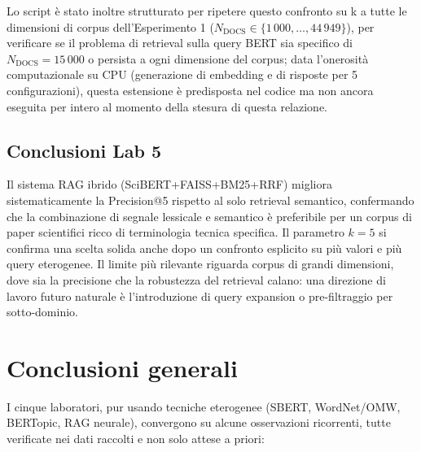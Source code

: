 \documentclass[12pt,a4paper]{article}
\begin{document}
Lo script \`e stato inoltre strutturato per ripetere questo confronto su k a tutte le dimensioni di corpus dell'Esperimento 1 ($N_{\text{DOCS}} \in \{1\,000, \dots, 44\,949\}$), per verificare se il problema di retrieval sulla query BERT sia specifico di $N_{\text{DOCS}}=15\,000$ o persista a ogni dimensione del corpus; data l'onerosit\`a computazionale su CPU (generazione di embedding e di risposte per 5 configurazioni), questa estensione \`e predisposta nel codice ma non ancora eseguita per intero al momento della stesura di questa relazione.

\subsection{Conclusioni Lab 5}

Il sistema RAG ibrido (SciBERT+FAISS+BM25+RRF) migliora sistematicamente la Precision@5 rispetto al solo retrieval semantico, confermando che la combinazione di segnale lessicale e semantico \`e preferibile per un corpus di paper scientifici ricco di terminologia tecnica specifica. Il parametro $k=5$ si confirma una scelta solida anche dopo un confronto esplicito su pi\`u valori e pi\`u query eterogenee. Il limite pi\`u rilevante riguarda corpus di grandi dimensioni, dove sia la precisione che la robustezza del retrieval calano: una direzione di lavoro futuro naturale \`e l'introduzione di query expansion o pre-filtraggio per sotto-dominio.

\section{Conclusioni generali}

I cinque laboratori, pur usando tecniche eterogenee (SBERT, WordNet/OMW, BERTopic, RAG neurale), convergono su alcune osservazioni ricorrenti, tutte verificate nei dati raccolti e non solo attese a priori:
\end{document}
